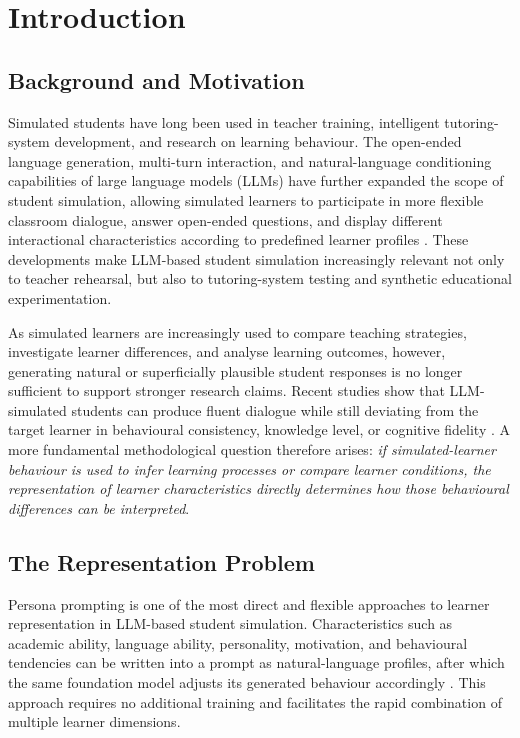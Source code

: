 \chapter{Introduction} \label{Chap1}

\section{Background and Motivation}

Simulated students have long been used in teacher training, intelligent tutoring-system development, and research on learning behaviour. The open-ended language generation, multi-turn interaction, and natural-language conditioning capabilities of large language models (LLMs) have further expanded the scope of student simulation, allowing simulated learners to participate in more flexible classroom dialogue, answer open-ended questions, and display different interactional characteristics according to predefined learner profiles \cite{markel-etal-2023-gpteach,liu-etal-2024-personality,chu-etal-2025-llm}. These developments make LLM-based student simulation increasingly relevant not only to teacher rehearsal, but also to tutoring-system testing and synthetic educational experimentation.

As simulated learners are increasingly used to compare teaching strategies, investigate learner differences, and analyse learning outcomes, however, generating natural or superficially plausible student responses is no longer sufficient to support stronger research claims. Recent studies show that LLM-simulated students can produce fluent dialogue while still deviating from the target learner in behavioural consistency, knowledge level, or cognitive fidelity \cite{martynova-etal-2025-can,scarlatos-etal-2026-simulated}. A more fundamental methodological question therefore arises: \textit{if simulated-learner behaviour is used to infer learning processes or compare learner conditions, the representation of learner characteristics directly determines how those behavioural differences can be interpreted}.

\section{The Representation Problem}

Persona prompting is one of the most direct and flexible approaches to learner representation in LLM-based student simulation. Characteristics such as academic ability, language ability, personality, motivation, and behavioural tendencies can be written into a prompt as natural-language profiles, after which the same foundation model adjusts its generated behaviour accordingly \cite{benedetto-etal-2024-using,liu-etal-2024-personality}. This approach requires no additional training and facilitates the rapid combination of multiple learner dimensions.

